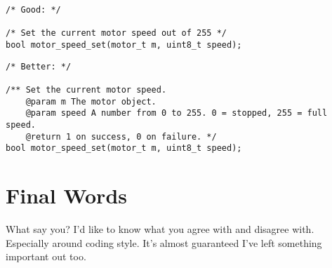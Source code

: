 \documentclass[10pt]{article}
\begin{document}
\begin{lstlisting}[frame=single]
/* Good: */

/* Set the current motor speed out of 255 */
bool motor_speed_set(motor_t m, uint8_t speed);
\end{lstlisting}

\begin{lstlisting}[frame=single]
/* Better: */

/** Set the current motor speed. 
	@param m The motor object.
	@param speed A number from 0 to 255. 0 = stopped, 255 = full speed.
	@return 1 on success, 0 on failure. */
bool motor_speed_set(motor_t m, uint8_t speed);
\end{lstlisting}

\section{Final Words}
What say you? I'd like to know what you agree with and disagree with. Especially around coding style. It's almost guaranteed I've left something important out too.
\end{document}
